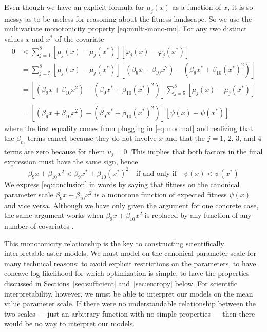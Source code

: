 \documentclass[11pt]{article}
\begin{document}
Even though we have an explicit formula for $\mu_j(x)$ as a function of $x$,
it is so messy as to be useless for reasoning about the fitness landscape.
So we use the multivariate monotonicity property \eqref{eq:multi-mono-mu}.
For any two distinct values $x$ and $x^*$ of the covariate
\begin{align*}
   0
   & <
   \sum_{j = 1}^8 [ \mu_j(x) - \mu_j(x^*) ] [ \varphi_j(x) - \varphi_j(x^*) ]
   \\
   & =
   \sum_{j = 5}^8 [ \mu_j(x) - \mu_j(x^*) ] [
   ( \beta_9 x + \beta_{10} x^2 )
   -
   ( \beta_9 x^* + \beta_{10} (x^*)^2 ) ]
   \\
   & =
   [ ( \beta_9 x + \beta_{10} x^2 ) -
   ( \beta_9 x^* + \beta_{10} (x^*)^2 ) ]
   \sum_{j = 5}^8 [ \mu_j(x) - \mu_j(x^*) ]
   \\
   \\
   & =
   [ ( \beta_9 x + \beta_{10} x^2 )
   -
   ( \beta_9 x^* + \beta_{10} (x^*)^2 ) ]
   [ \psi(x) - \psi(x^*) ]
\end{align*}
where the first equality comes from plugging in \eqref{eq:modmat} and realizing
that the $\beta_{v_j}$ terms cancel because they do not involve $x$ and
that the $j = 1$, 2, 3, and 4 terms are zero because for them $u_j = 0$.
This implies that both factors in the final expression must have the same
sign, hence
\begin{equation} \label{eq:conclusion}
   \beta_9 x + \beta_{10} x^2 < \beta_9 x^* + \beta_{10} (x^*)^2
   \quad \text{if and only if} \quad
   \psi(x) < \psi(x^*)
\end{equation}
We express \eqref{eq:conclusion} in words by saying
that fitness on the canonical parameter scale $\beta_9 x + \beta_{10} x^2$
is a monotone function of expected fitness $\psi(x)$ and vice versa.
Although we have only given the argument for one concrete case,
the same argument works when $\beta_9 x + \beta_{10} x^2$ is replaced by any
function of any number of covariates \citep[appendix on monotonicity]{aster3}.

This monotonicity relationship is the key to constructing scientifically
interpretable aster models.  We must model on the canonical parameter scale
for many technical reasons: to avoid explicit restrictions on the parameters,
to have concave log likelihood for which optimization is simple, to have
the properties discussed in Sections~\ref{sec:sufficient} and~\ref{sec:entropy}
below.  For scientific interpretability, however, we must be able to interpret
our models on the mean value parameter scale.  If there were no understandable
relationship between the two scales --- just an arbitrary function with no
simple properties --- then there would be no way to interpret our models.
\end{document}
